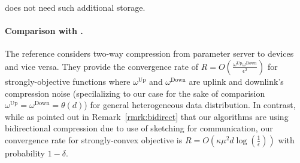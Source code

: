 does not need such additional storage.      

\paragraph{Comparison with \cite{philippenko2020artemis}.} The reference \cite{philippenko2020artemis} considers two-way compression from parameter server to devices and vice versa. They provide the convergence rate of $R=O\left(\frac{\omega^{\text{Up}}\omega^{\text{Down}}}{\epsilon^2}\right)$ for strongly-objective functions where $\omega^{\text{Up}}$ and $\omega^{\text{Down}}$ are uplink and downlink's compression noise (specilalizing to our case for the sake of comparision $\omega^{\text{Up}}=\omega^{\text{Down}}=\theta\left(d\right)$) for general heterogeneous data distribution. In contrast, while as pointed out in Remark~\ref{rmrk:bidirect} that our algorithms are using bidirectional compression due to use of sketching for communication, our convergence rate for strongly-convex objective is $R=O(\kappa\mu^2d\log\left(\frac{1}{\epsilon}\right))$ with probability $1-\delta$.  






